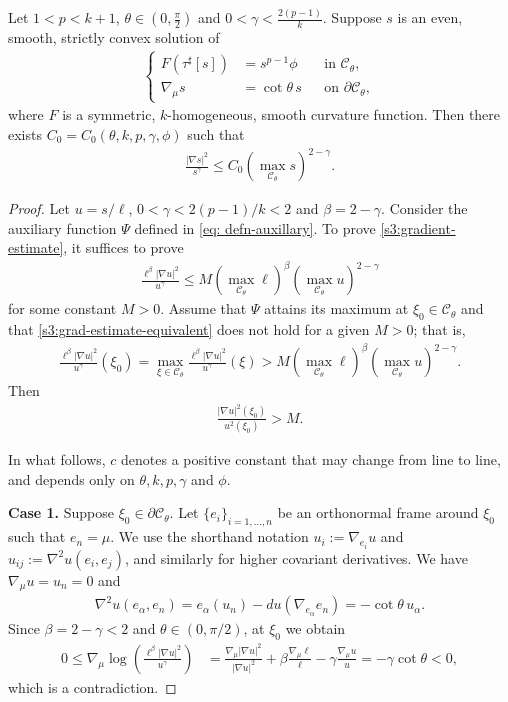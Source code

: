 \documentclass[12pt]{amsart}
\numberwithin{equation}{section}
\newcommand{\8}{\infty}
\newcommand{\al}{\alpha}
\newcommand{\cC}{\mathcal{C}}
\newcommand{\del}{\partial}
\newcommand{\eq}[1]{\begin{equation}\begin{alignedat}{2}#1\end{alignedat}\end{equation}}
\newcommand{\Cth}{\cC_\theta}
\begin{document}
\begin{lemma}\label{lem: grad estimate}
Let $1<p<k+1$, $\theta\in (0,\frac{\pi}{2})$ and $0<\gamma<\frac{2(p-1)}{k}$. Suppose $s$ is an even, smooth, strictly convex solution of
\eq{\label{s3:F-eq}
\left\{
\begin{aligned}
  F(\tau^\sharp[s])&=s^{p-1}\phi
    &&\text{in }\Cth,\\
  \nabla_\mu s &= \cot\theta\,s
    &&\text{on }\partial\Cth,
\end{aligned}
\right.
}
where $F$ is a symmetric, $k$-homogeneous, smooth curvature function. Then there exists $C_0=C_0(\theta,k,p,\gamma,\phi)$ such that
\eq{\label{s3:gradient-estimate}
\frac{|\nabla s|^2}{s^{\gamma}}\leq C_0 \left(\max_{\cC_\theta} s\right)^{2-\gamma}.
}
\end{lemma}
\begin{proof}
Let $u=s/\ell$, $0<\gamma<2(p-1)/k<2$ and $\beta=2-\gamma$. Consider the auxiliary function  $\Psi$ defined in \eqref{eq: defn-auxillary}.  To prove \eqref{s3:gradient-estimate}, it suffices to prove
\eq{\label{s3:grad-estimate-equivalent}
\frac{\ell^{\beta}|\nabla u|^2}{u^{\gamma}}
\leq
M \left(\max_{\cC_\theta}\ell\right)^\beta\left(\max_{\cC_\theta} u\right)^{2-\gamma}
}
for some constant $M>0$.
Assume that $\Psi$ attains its maximum at $\xi_0\in\cC_\theta$ and that
\eqref{s3:grad-estimate-equivalent} does not hold for a given $M>0$; that is,
\eq{
\frac{\ell^{\beta}|\nabla u|^2}{u^\gamma}(\xi_0)
=\max_{\xi\in \cC_\theta} \frac{\ell^{\beta}|\nabla u|^2}{u^\gamma}(\xi)> M \left(\max_{\cC_\theta}\ell\right)^\beta\left(\max_{\cC_\theta} u\right)^{2-\gamma} .
}
Then
\eq{
\frac{|\nabla u|^2(\xi_0)}{u^2(\xi_0)}> M.
}

In what follows, $c$ denotes a positive constant that may change from line to line, and depends only on $\theta,k,p,\gamma$ and $\phi$.

{\bf Case 1.} Suppose $\xi_0\in \del \cC_\theta$. Let $\{e_i\}_{i=1,\ldots,n}$ be an orthonormal frame around $\xi_0$ such that $e_n=\mu$. We use the shorthand notation $u_i:=\nabla_{e_i}u$ and $u_{ij}:=\nabla^2u(e_i,e_j)$, and similarly for higher covariant derivatives.
We have $\nabla_\mu u=u_n=0$ and
\eq{
\nabla^2 u(e_\al,e_n)=e_{\al}(u_n)-d u(\nabla_{e_\al}e_n)=-\cot\theta\, u_\al.
}
Since $\beta=2-\gamma<2$ and $\theta\in (0,\pi/2)$, at $\xi_0$ we obtain
\eq{
0\leq \nabla_\mu \log\left(\frac{\ell^\beta|\nabla u|^2}{u^{\gamma}}\right)
&=\frac{\nabla_\mu |\nabla u|^2}{|\nabla u|^2}+\beta\frac{\nabla_\mu\ell}{\ell}-\gamma \frac{\nabla_\mu u}{u}= -\gamma \cot\theta<0,
}
which is a contradiction.


\end{proof}
\end{document}
